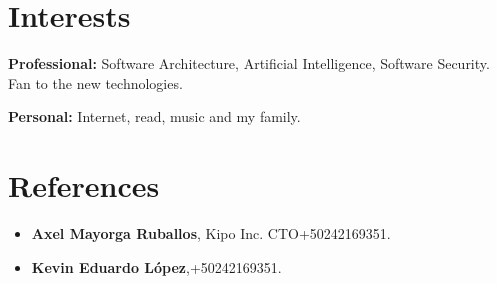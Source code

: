 \documentclass[]{friggeri-cv} %
\begin{document}



\section{Interests}

\textbf{Professional:} Software Architecture, Artificial Intelligence, Software Security. Fan to the new technologies. 

\textbf{Personal:} Internet, read, music and my family.

\section{References}

\begin{itemize}
	\item \noindent \textbf{Axel Mayorga Ruballos}, Kipo Inc. CTO\hfill \hfill  +50242169351.
	\item \noindent \textbf{Kevin Eduardo López},\hfill \hfill +50242169351.
\end{itemize}
\end{document}
